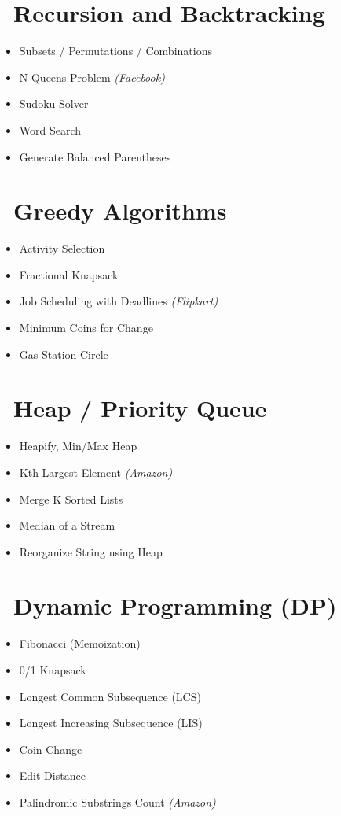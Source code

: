 \section*{\ Recursion and Backtracking}
\begin{itemize}
  \item Subsets / Permutations / Combinations
  \item N-Queens Problem \textit{(Facebook)}
  \item Sudoku Solver
  \item Word Search
  \item Generate Balanced Parentheses
\end{itemize}

\section*{\ Greedy Algorithms}
\begin{itemize}
  \item Activity Selection
  \item Fractional Knapsack
  \item Job Scheduling with Deadlines \textit{(Flipkart)}
  \item Minimum Coins for Change
  \item Gas Station Circle
\end{itemize}

\section*{\ Heap / Priority Queue}
\begin{itemize}
  \item Heapify, Min/Max Heap
  \item Kth Largest Element \textit{(Amazon)}
  \item Merge K Sorted Lists
  \item Median of a Stream
  \item Reorganize String using Heap
\end{itemize}

\section*{\ Dynamic Programming (DP)}
\begin{itemize}
  \item Fibonacci (Memoization)
  \item 0/1 Knapsack
  \item Longest Common Subsequence (LCS)
  \item Longest Increasing Subsequence (LIS)
  \item Coin Change
  \item Edit Distance
  \item Palindromic Substrings Count \textit{(Amazon)}
\end{itemize}

